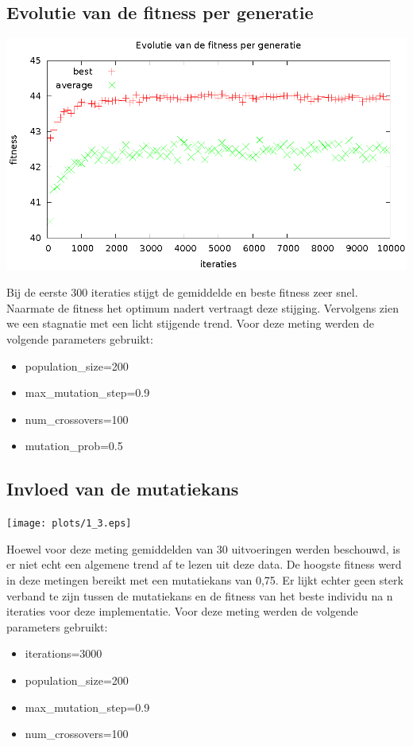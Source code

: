 \documentclass[]{article}
\begin{document}
\subsection{Evolutie van de fitness per generatie}
\begin{center}\includegraphics{plots/1_2.eps}\end{center}
Bij de eerste 300 iteraties stijgt de gemiddelde en beste fitness zeer snel. Naarmate de fitness het optimum nadert vertraagt deze stijging.
Vervolgens zien we een stagnatie met een licht stijgende trend. Voor deze meting werden de volgende parameters gebruikt:
\begin{itemize}
\item population\_size=200
\item max\_mutation\_step=0.9
\item num\_crossovers=100
\item mutation\_prob=0.5
\end{itemize}

\subsection{Invloed van de mutatiekans}
\begin{center}\texttt{[image: plots/1\_3.eps]}\end{center}
Hoewel voor deze meting gemiddelden van 30 uitvoeringen werden beschouwd, is er niet echt een algemene trend af te lezen uit deze data.
De hoogste fitness werd in deze metingen bereikt met een mutatiekans van 0,75. Er lijkt echter geen sterk verband te zijn tussen de mutatiekans en de fitness van het beste individu na n iteraties voor deze implementatie.
Voor deze meting werden de volgende parameters gebruikt:
\begin{itemize}
\item iterations=3000
\item population\_size=200
\item max\_mutation\_step=0.9
\item num\_crossovers=100
\end{itemize}
\end{document}
